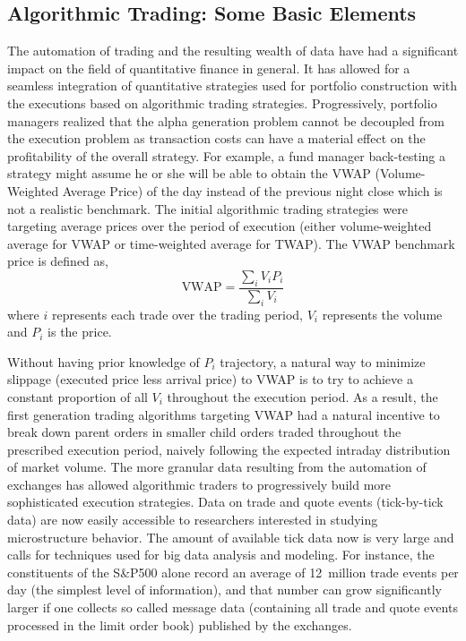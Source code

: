 \subsection{Algorithmic Trading: Some Basic Elements}


The automation of trading and the resulting wealth of data have had a significant impact on the field of quantitative finance in general. It has allowed for a seamless integration of quantitative strategies used for portfolio construction with the executions based on algorithmic trading strategies. Progressively, portfolio managers realized that the alpha generation problem cannot be decoupled from the execution problem as transaction costs can have a material effect on the profitability of the overall strategy. For example, a fund manager back-testing a strategy might assume he or she will be able to obtain the VWAP (Volume-Weighted Average Price) of the day instead of the previous night close which is not a realistic benchmark. The initial algorithmic trading strategies were targeting average prices over the period of execution (either volume-weighted average for VWAP or time-weighted average for TWAP). The VWAP benchmark price is defined as,
	\begin{equation} 
	\text{VWAP}=\dfrac{\sum_iV_iP_i}{\sum_iV_i} 
	\end{equation}
where $i$ represents each trade over the trading period, $V_i$ represents the volume and $P_i$ is the price.


Without having prior knowledge of $P_i$ trajectory, a natural way to minimize slippage (executed price less arrival price) to VWAP is to try to achieve a constant proportion of all $V_i$ throughout the execution period. As a result, the first generation trading algorithms targeting VWAP had a natural incentive to break down parent orders in smaller child orders traded throughout the prescribed execution period, naively following the expected intraday distribution of market volume. The more granular data resulting from the automation of exchanges has allowed algorithmic traders to progressively build more sophisticated execution strategies. Data on trade and quote events (tick-by-tick data) are now easily accessible to researchers interested in studying microstructure behavior. The amount of available tick data now is very large and calls for techniques used for big data analysis and modeling. For instance, the constituents of the S\&P500 alone record an average of 12~million trade events per day (the simplest level of information), and that number can grow significantly larger if one collects so called message data (containing all trade and quote events processed in the limit order book) published by the exchanges.


